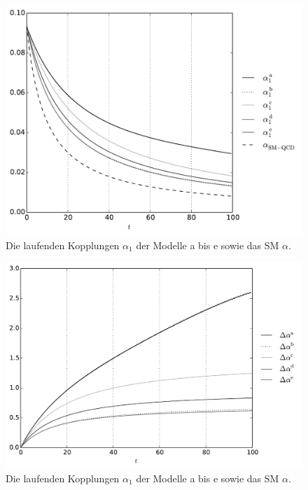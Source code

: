 \begin{figure}
  \centering
  \includegraphics[scale=0.7]{Python/plots/alpha_running/Kopplungen1_her.pdf}
  \caption{Die laufenden Kopplungen $\alpha_1$ der Modelle a bis e sowie 
  das SM $\alpha$.}
  \label{fig:messbarkeit:alpha_running_afix2}
\end{figure}

\begin{figure}
  \centering
  \includegraphics[scale=0.7]{Python/plots/alpha_running/relative_deviation_her.pdf}
  \caption{Die laufenden Kopplungen $\alpha_1$ der Modelle a bis e sowie 
  das SM $\alpha$.}
  \label{fig:messbarkeit:relative_deviation}
\end{figure}
